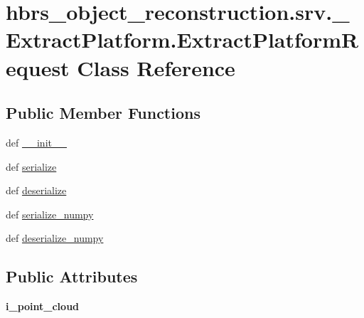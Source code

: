 \hypertarget{classhbrs__object__reconstruction_1_1srv_1_1___extract_platform_1_1_extract_platform_request}{\section{hbrs\-\_\-object\-\_\-reconstruction.\-srv.\-\_\-\-Extract\-Platform.\-Extract\-Platform\-Request \-Class \-Reference}
\label{classhbrs__object__reconstruction_1_1srv_1_1___extract_platform_1_1_extract_platform_request}
}
\subsection*{\-Public \-Member \-Functions}
\begin{DoxyCompactItemize}
\item 
def \hyperlink{classhbrs__object__reconstruction_1_1srv_1_1___extract_platform_1_1_extract_platform_request_aca8dd1f116b3016df251d08aa5c62ff9}{\-\_\-\-\_\-init\-\_\-\-\_\-}
\item 
def \hyperlink{classhbrs__object__reconstruction_1_1srv_1_1___extract_platform_1_1_extract_platform_request_af15f40208832c593d95b3e64369ced6d}{serialize}
\item 
def \hyperlink{classhbrs__object__reconstruction_1_1srv_1_1___extract_platform_1_1_extract_platform_request_ae4366cc755c65b3f64efa109cc52361a}{deserialize}
\item 
def \hyperlink{classhbrs__object__reconstruction_1_1srv_1_1___extract_platform_1_1_extract_platform_request_ab94fc56ee08d5c0ee8b147a71648125a}{serialize\-\_\-numpy}
\item 
def \hyperlink{classhbrs__object__reconstruction_1_1srv_1_1___extract_platform_1_1_extract_platform_request_a04e812a0a8ebf3d8f83f75344f2087ed}{deserialize\-\_\-numpy}
\end{DoxyCompactItemize}
\subsection*{\-Public \-Attributes}
\begin{DoxyCompactItemize}
\item 
\hypertarget{classhbrs__object__reconstruction_1_1srv_1_1___extract_platform_1_1_extract_platform_request_ac465a0550257d3068eb4c26887648ea2}{{\bfseries i\-\_\-point\-\_\-cloud}}\label{classhbrs__object__reconstruction_1_1srv_1_1___extract_platform_1_1_extract_platform_request_ac465a0550257d3068eb4c26887648ea2}

\end{DoxyCompactItemize}


